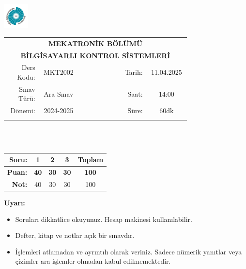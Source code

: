 \newcommand\UniversiteAdi{Niğde Ömer Halisdemir Üniversitesi}
\newcommand\BolumAdi{MEKATRONİK BÖLÜMÜ}
\newcommand\DersKodu{MKT2002}
\newcommand\DersAdi{BİLGİSAYARLI KONTROL SİSTEMLERİ}
\newcommand\SinavAdi{Ara Sınav}
\newcommand\SinavTarihi{11.04.2025}
\newcommand\SinavSaati{14:00}
\newcommand\SinavSuresi{60dk}

\pagestyle{fancy}
\fancyhf{} %
\noindent \includegraphics[width=0.1\textwidth]{logo}
\begin{tabular}{
    p{0.15\linewidth}
    p{0.15\linewidth}
    p{0.2\linewidth}
    p{0.1\linewidth}
    p{0.15\linewidth}}
    \multicolumn{5}{c}{\textbf{\BolumAdi}}\\
    \multicolumn{5}{c}{\textbf{\DersAdi}}\\\hline
    \multicolumn{1}{|r|}{Ders Kodu:}&
    \multicolumn{1}{|c|}{\DersKodu}&
    \multicolumn{1}{|c|}{}& 
    \multicolumn{1}{|r|}{Tarih:}&
    \multicolumn{1}{|c|}{\SinavTarihi} \\\hline
    \multicolumn{1}{|r|}{Sınav Türü:}&
    \multicolumn{1}{|c|}{\SinavAdi}&  
    \multicolumn{1}{|c|}{}&
    \multicolumn{1}{|r|}{Saat:}&
    \multicolumn{1}{|c|}{\SinavSaati}\\\hline
    \multicolumn{1}{|r|}{Dönemi:}&
    \multicolumn{1}{|c|}{2024-2025}&
    \multicolumn{1}{|c|}{}&
    \multicolumn{1}{|r|}{Süre:}&
    \multicolumn{1}{|c|}{\SinavSuresi} \\\hline
    &&&&\\
\end{tabular}\\\\
\noindent\begin{center}
\begin{tabular}{|r|c|c|c|c|}\hline
    \textbf{Soru:}&
    \textbf{1}&
    \textbf{2}&
    \textbf{3}&
    \textbf{Toplam}\\\hline
    \textbf{Puan:}&
    \textbf{40}&
    \textbf{30}&
    \textbf{30}&
    \textbf{100}\\\hline
    \textbf{Not:}&40&30&30&100\\\hline
\end{tabular}\end{center}
\noindent\textbf{Uyarı:}
\begin{itemize}\bfseries
    \item Soruları dikkatlice okuyunuz. Hesap makinesi kullanılabilir.
    \item Defter, kitap ve notlar açık bir sınavdır.
    \item İşlemleri atlamadan ve ayrıntılı olarak veriniz. Sadece nümerik yanıtlar veya çizimler ara işlemler olmadan kabul edilmemektedir.
\end{itemize}

